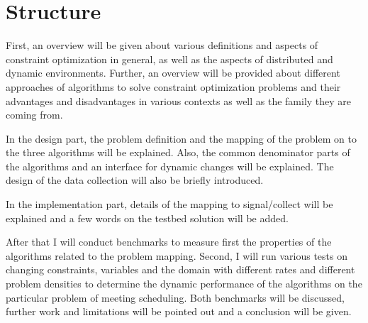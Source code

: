 \section{Structure}
First, an overview will be given about various definitions and aspects of constraint optimization in general, as well as the aspects of  distributed and dynamic environments. Further, an overview will be provided about different approaches of algorithms to solve constraint optimization problems and their advantages and disadvantages in various contexts as well as the family they are coming from. 

In the design part, the problem definition and the mapping of the problem on to the three algorithms will be explained. Also, the common denominator parts of the algorithms and an interface for dynamic changes will be explained. The design of the data collection will also be briefly introduced.

In the implementation part, details of the mapping to signal/collect will be explained and a few words on the testbed solution will be added.

After that I will conduct benchmarks to measure first the properties of the algorithms related to the problem mapping. Second, I will run various tests on changing constraints, variables and the domain with different rates and different problem densities to determine the dynamic performance of the algorithms on the particular problem of meeting scheduling. Both benchmarks will be discussed, further work and limitations will be pointed out and a conclusion will be given.